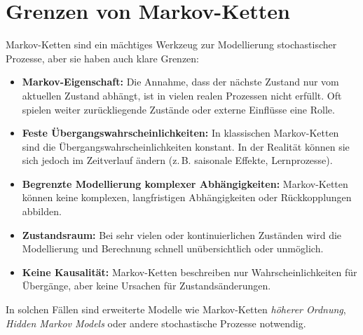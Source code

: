 \section{Grenzen von Markov-Ketten}

Markov-Ketten sind ein mächtiges Werkzeug zur Modellierung stochastischer Prozesse, aber sie haben auch klare Grenzen:

\begin{itemize}
    \item \textbf{Markov-Eigenschaft:} Die Annahme, dass der nächste Zustand nur vom aktuellen Zustand abhängt, ist in vielen realen Prozessen nicht erfüllt. Oft spielen weiter zurückliegende Zustände oder externe Einflüsse eine Rolle.
    \item \textbf{Feste Übergangswahrscheinlichkeiten:} In klassischen Markov-Ketten sind die Übergangswahrscheinlichkeiten konstant. In der Realität können sie sich jedoch im Zeitverlauf ändern (z.\,B. saisonale Effekte, Lernprozesse).
    \item \textbf{Begrenzte Modellierung komplexer Abhängigkeiten:} Markov-Ketten können keine komplexen, langfristigen Abhängigkeiten oder Rückkopplungen abbilden.
    \item \textbf{Zustandsraum:} Bei sehr vielen oder kontinuierlichen Zuständen wird die Modellierung und Berechnung schnell unübersichtlich oder unmöglich.
    \item \textbf{Keine Kausalität:} Markov-Ketten beschreiben nur Wahrscheinlichkeiten für Übergänge, aber keine Ursachen für Zustandsänderungen.
\end{itemize}

In solchen Fällen sind erweiterte Modelle wie Markov-Ketten \emph{höherer Ordnung}, \emph{Hidden Markov Models} oder andere stochastische Prozesse notwendig.
